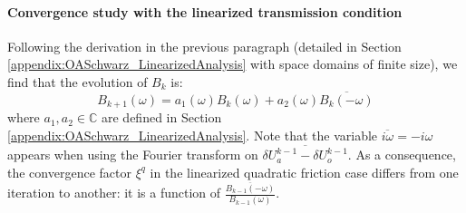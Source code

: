 \paragraph{Convergence study with the linearized transmission condition}
Following the derivation in the previous paragraph (detailed in
Section \ref{appendix:OASchwarz_LinearizedAnalysis} with
space domains of finite size),
we find that the evolution of $B_k$ is:
\begin{equation}
	\label{eq:OASchwarz_ConvergenceAnalysis_linearizedCV}
	B_{k+1}(\omega) = a_1(\omega) B_{k}(\omega) + a_2(\omega)
		\overline{B_{k}(-{\omega})}
\end{equation}
where $a_1, a_2 \in \mathbb{C}$ are defined in
Section \ref{appendix:OASchwarz_LinearizedAnalysis}.
Note that the variable $\overline{i \omega}=-i\omega$ appears when using the Fourier
transform on $\overline{\delta U_a^{k-1} - \delta U_o^{k-1}}$.
As a consequence,
the convergence factor $\xi^q$ in the linearized 
quadratic friction case differs from one iteration to another:
it is a function of
$\frac{\overline{B_{k-1}(-\omega)}}{B_{k-1}(\omega)}$.
